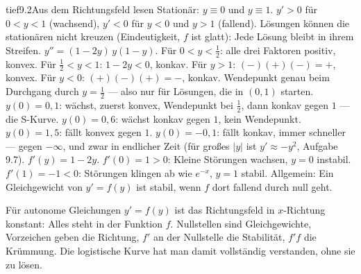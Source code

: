 \begin{loesungkarte}{tief}{9.2}{Aus dem Richtungsfeld lesen}
Stationär: $y\equiv0$ und $y\equiv1$. $y' > 0$ für $0 < y < 1$ (wachsend), $y' < 0$ für $y < 0$ und $y > 1$ (fallend). Lösungen können die stationären nicht kreuzen (Eindeutigkeit, $f$ ist glatt): Jede Lösung bleibt in ihrem Streifen.
$y'' = (1 - 2y)\,y(1 - y)$. Für $0 < y < \frac12$: alle drei Faktoren positiv, konvex. Für $\frac12 < y < 1$: $1 - 2y < 0$, konkav. Für $y > 1$: $(-)(+)(-) = +$, konvex. Für $y < 0$: $(+)(-)(+) = -$, konkav. Wendepunkt genau beim Durchgang durch $y = \frac12$ --- also nur für Lösungen, die in $(0, 1)$ starten.
$y(0) = 0{,}1$: wächst, zuerst konvex, Wendepunkt bei $\frac12$, dann konkav gegen $1$ --- die S-Kurve. $y(0) = 0{,}6$: wächst konkav gegen $1$, kein Wendepunkt. $y(0) = 1{,}5$: fällt konvex gegen $1$. $y(0) = -0{,}1$: fällt konkav, immer schneller --- gegen $-\infty$, und zwar in endlicher Zeit (für großes $|y|$ ist $y'\approx-y^{2}$, Aufgabe 9.7).
$f'(y) = 1 - 2y$. $f'(0) = 1 > 0$: Kleine Störungen wachsen, $y = 0$ instabil. $f'(1) = -1 < 0$: Störungen klingen ab wie $e^{-x}$, $y = 1$ stabil. Allgemein: Ein Gleichgewicht von $y' = f(y)$ ist stabil, wenn $f$ dort fallend durch null geht.
\begin{mitnehmen}\kastentext
Für autonome Gleichungen $y' = f(y)$ ist das Richtungsfeld in $x$-Richtung konstant: Alles steht in der Funktion $f$. Nullstellen sind Gleichgewichte, Vorzeichen geben die Richtung, $f'$ an der Nullstelle die Stabilität, $f'f$ die Krümmung. Die logistische Kurve hat man damit vollständig verstanden, ohne sie zu lösen.
\end{mitnehmen}
\end{loesungkarte}

